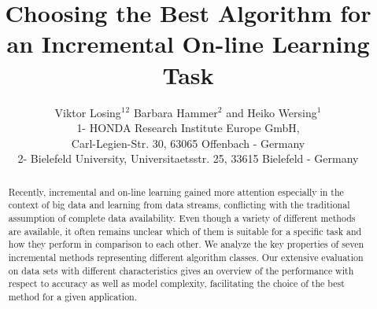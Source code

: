 \documentclass{esann}
\begin{document}
\title{Choosing the Best Algorithm for an Incremental On-line Learning Task}

\author{Viktor Losing$^1$$^2$ Barbara Hammer$^2$ and Heiko Wersing$^1$
%
%
\vspace{.3cm}\\
%
1- HONDA Research Institute Europe GmbH,\\
Carl-Legien-Str. 30, 63065 Offenbach - Germany
%
\vspace{.1cm}\\
2- Bielefeld University, Universitaetsstr. 25, 33615 Bielefeld - Germany
}

\maketitle

\begin{abstract}
Recently, incremental and on-line learning gained more attention 
especially in the context of big data and learning from data streams,
conflicting with the traditional assumption of complete data availability. Even though 
a variety of different methods are available, it often remains unclear which of them is suitable
for a specific task and how they perform in comparison to each other. 
We analyze the key properties of seven incremental methods representing different algorithm classes.
Our extensive evaluation on data sets with different characteristics gives an overview of the performance with respect to accuracy as well as model complexity,
facilitating the choice of the best method for a given application.
\end{abstract}
\end{document}
